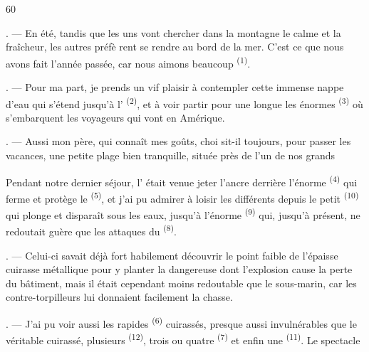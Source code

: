 \begin{VUpage}[62]{60}
\VUsaut{4.0mm}
\VUsaut{1.6mm}
\VUsaut{3.0mm}

. --- En été, tandis que les uns vont chercher dans\nl
la montagne le calme et la fraîcheur, les autres préfè\cc
rent se rendre au bord de la mer. C'est ce que nous\nl
avons fait l'année passée, car nous aimons beaucoup\nl
{} \textsuperscript{(1)}.

. --- Pour ma part, je prends un vif plaisir à\nl
contempler cette immense nappe d'eau qui s'étend\nl
jusqu'à l' \textsuperscript{(2)}, et à voir partir pour une longue\nl
{} les énormes  \textsuperscript{(3)} où\nl
s'embarquent les voyageurs qui vont en Amérique.

. --- Aussi mon père, qui connaît mes goûts, choi\cc
sit-il toujours, pour passer les vacances, une petite\nl
plage bien tranquille, située près de l'un de nos\nl
grands 

Pendant notre dernier séjour, l' était\nl
venue jeter l'ancre derrière l'énorme  \textsuperscript{(4)} qui\nl
ferme et protège le  \textsuperscript{(5)}, et j'ai pu\nl
admirer à loisir les différents \nl
depuis le petit  \textsuperscript{(10)} qui plonge et disparaît\nl
sous les eaux, jusqu'à l'énorme  \textsuperscript{(9)} qui,\nl
jusqu'à présent, ne redoutait guère que les attaques\nl
du  \textsuperscript{(8)}.

. --- Celui-ci savait déjà fort habilement découvrir\nl
le point faible de l'épaisse cuirasse métallique pour y\nl
planter la dangereuse  dont l'explosion cause\nl
la perte du bâtiment, mais il était cependant moins\nl
redoutable que le sous-marin, car les contre-torpilleurs\nl
lui donnaient facilement la chasse.

. --- J'ai pu voir aussi les rapides \textsuperscript{(6)}\nl
cuirassés, presque aussi invulnérables que le véritable\nl
cuirassé, plusieurs  \textsuperscript{(12)}, trois ou quatre\nl
{}\textsuperscript{(7)} et enfin une \textsuperscript{(11)}. Le spectacle
\parplein
\end{VUpage}

